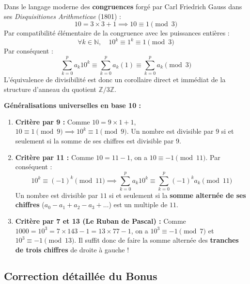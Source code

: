 \documentclass[11pt,a4paper]{article}
\newcommand{\N}{\mathbb{N}}
\newcommand{\Z}{\mathbb{Z}}
\begin{document}
\begin{prolongementbox}
Dans le langage moderne des \textbf{congruences} forgé par Carl Friedrich Gauss dans ses \emph{Disquisitiones Arithmeticae} (1801) :
\[
10 = 3 \times 3 + 1 \implies 10 \equiv 1 \pmod 3
\]
Par compatibilité élémentaire de la congruence avec les puissances entières :
\[
\forall k \in \N, \quad 10^k \equiv 1^k \equiv 1 \pmod 3
\]
Par conséquent :
\[
\sum_{k=0}^p a_k 10^k \equiv \sum_{k=0}^p a_k (1) \equiv \sum_{k=0}^p a_k \pmod 3
\]
L'équivalence de divisibilité est donc un corollaire direct et immédiat de la structure d'anneau du quotient $\Z/3\Z$.

\textbf{Généralisations universelles en base 10 :}
\begin{enumerate}[leftmargin=*, label=$\bullet$]
    \item \textbf{Critère par 9 :} Comme $10 = 9 \times 1 + 1$, $10 \equiv 1 \pmod 9 \implies 10^k \equiv 1 \pmod 9$. Un nombre est divisible par $9$ si et seulement si la somme de ses chiffres est divisible par $9$.
    \item \textbf{Critère par 11 :} Comme $10 = 11 - 1$, on a $10 \equiv -1 \pmod{11}$. Par conséquent :
    \[
    10^k \equiv (-1)^k \pmod{11} \implies \sum_{k=0}^p a_k 10^k \equiv \sum_{k=0}^p (-1)^k a_k \pmod{11}
    \]
    Un nombre est divisible par $11$ si et seulement si la \textbf{somme alternée de ses chiffres} ($a_0 - a_1 + a_2 - a_3 + \dots$) est un multiple de $11$.
    \item \textbf{Critère par 7 et 13 (Le Ruban de Pascal) :} Comme $1000 = 10^3 = 7 \times 143 - 1 = 13 \times 77 - 1$, on a $10^3 \equiv -1 \pmod 7$ et $10^3 \equiv -1 \pmod{13}$. Il suffit donc de faire la somme alternée des \textbf{tranches de trois chiffres} de droite à gauche !
\end{enumerate}
\end{prolongementbox}

\vspace{0.3cm}

\subsection*{Correction détaillée du Bonus}
\end{document}
